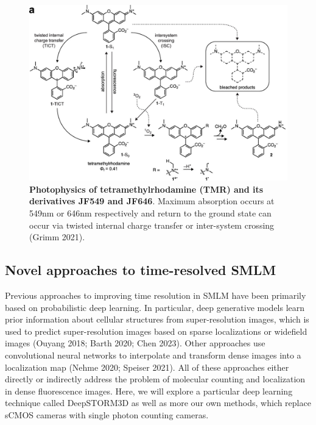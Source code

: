 \documentclass{ucetd}
\begin{document}
\begin{figure}
\begin{center}
\includegraphics[width=14cm]{Rhodamines.png}
\end{center}
\caption{\textbf{Photophysics of tetramethylrhodamine (TMR) and its derivatives JF549 and JF646}. Maximum absorption occurs at 549nm or 646nm respectively and return to the ground state can occur via twisted internal charge transfer or inter-system crossing (Grimm 2021).}
\end{figure}


\subsection{Novel approaches to time-resolved SMLM}

Previous approaches to improving time resolution in SMLM have been primarily based on probabilistic deep learning. In particular, deep generative models learn prior information about cellular structures from super-resolution images, which is used to predict super-resolution images based on sparse localizations or widefield images (Ouyang 2018; Barth 2020; Chen 2023). Other approaches use convolutional neural networks to interpolate and transform dense images into a localization map (Nehme 2020; Speiser 2021). All of these approaches either directly or indirectly address the problem of molecular counting and localization in dense fluorescence images. Here, we will explore a particular deep learning technique called DeepSTORM3D as well as more our own methods, which replace sCMOS cameras with single photon counting cameras. 
\end{document}
